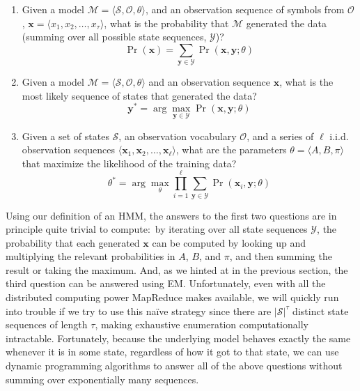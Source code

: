 \begin{enumerate}
\item Given a model $\mathcal{M} = \langle \mathcal{S}, \mathcal{O}, \theta \rangle$, and an observation sequence of symbols from $\mathcal{O}$, $\textbf{x} = \langle x_1 , x_2 , \ldots , x_{\tau} \rangle$, what is the probability that $\mathcal{M}$ generated the data (summing over all possible state sequences, $\mathcal{Y}$)?
\begin{equation}
\Pr(\textbf{x}) = \sum_{\textbf{y} \in \mathcal{Y}}\Pr(\textbf{x},\textbf{y};\theta)
\end{equation}
\item Given a model $\mathcal{M} = \langle \mathcal{S}, \mathcal{O}, \theta \rangle$ and an observation sequence $\textbf{x}$, what is the most likely sequence of states that generated the data?
\begin{equation}
\textbf{y}^* = \arg \max_{\textbf{y} \in \mathcal{Y}} \Pr(\textbf{x},\textbf{y};\theta)
\end{equation}
\item Given a set of states $\mathcal{S}$, an observation vocabulary $\mathcal{O}$, and a series of $\ell$ i.i.d. observation sequences $\langle \textbf{x}_1,\textbf{x}_2,\ldots, \textbf{x}_{\ell} \rangle$, what are the parameters $\theta=\langle A, B, \pi \rangle$ that maximize the likelihood of the training data?
\begin{equation}
\theta^* = \arg \max_{\theta} \prod_{i=1}^{\ell} \sum_{\textbf{y} \in \mathcal{Y}} \Pr(\textbf{x}_i,\textbf{y};\theta)
\end{equation}
\end{enumerate}

\noindent Using our definition of an HMM, the answers to the first two
questions are in principle quite trivial to compute:\ by iterating
over all state sequences $\mathcal{Y}$, the probability that each
generated $\textbf{x}$ can be computed by looking up and multiplying
the relevant probabilities in $A$, $B$, and $\pi$, and then summing
the result or taking the maximum. And, as we hinted at in the previous
section, the third question can be answered using EM.  Unfortunately,
even with all the distributed computing power MapReduce makes
available, we will quickly run into trouble if we try to use this
na\"ive strategy since there are $|\mathcal{S}|^{\tau}$ distinct state
sequences of length $\tau$, making exhaustive enumeration
computationally intractable. Fortunately, because the underlying model
behaves exactly the same whenever it is in some state, regardless of
how it got to that state, we can use dynamic programming algorithms to
answer all of the above questions without summing over exponentially
many sequences.

